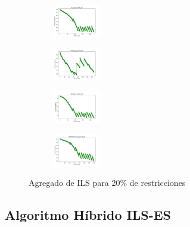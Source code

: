 \begin{figure}[H]
\begin{subfigure}
        \centering
        \includegraphics[width=0.234\textwidth]{img/ils/iris_set_const_20_3773969821_cost.png}
    \end{subfigure}
    \hfill
    \begin{subfigure}
        \centering
        \includegraphics[width=0.234\textwidth]{img/ils/ecoli_set_const_20_3773969821_cost.png}
    \end{subfigure}
    \hfill
    \begin{subfigure}
        \centering
        \includegraphics[width=0.234\textwidth]{img/ils/rand_set_const_20_3773969821_cost.png}
    \end{subfigure}
    \hfill
    \begin{subfigure}
        \centering
        \includegraphics[width=0.234\textwidth]{img/ils/newthyroid_set_const_20_3773969821_cost.png}
    \end{subfigure}
    \caption{Agregado de ILS para 20\% de restricciones}
\end{figure}

\vspace*{\fill}
\newpage


\subsection{Algoritmo Híbrido ILS-ES}

